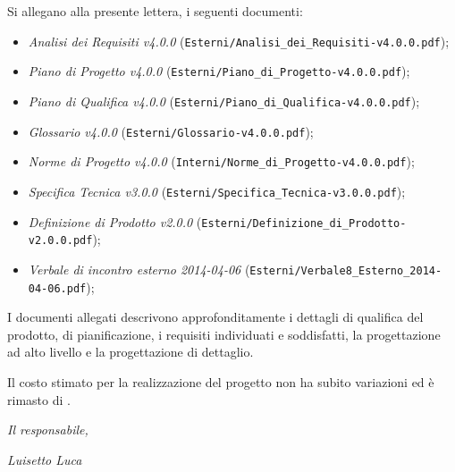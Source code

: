 \documentclass[10pt,a4paper,sans]{moderncv}        %
\begin{document}
Si allegano alla presente lettera, i seguenti documenti:
\begin{itemize}
	\item \textit{Analisi dei Requisiti v4.0.0} ({\verb!Esterni/Analisi_dei_Requisiti-v4.0.0.pdf!});
	\item \textit{Piano di Progetto v4.0.0} ({\verb!Esterni/Piano_di_Progetto-v4.0.0.pdf!});
	\item \textit{Piano di Qualifica v4.0.0} ({\verb!Esterni/Piano_di_Qualifica-v4.0.0.pdf!});
	\item \textit{Glossario v4.0.0} ({\verb!Esterni/Glossario-v4.0.0.pdf!});
	\item \textit{Norme di Progetto v4.0.0} ({\verb!Interni/Norme_di_Progetto-v4.0.0.pdf!});
	\item \textit{Specifica Tecnica v3.0.0} ({\verb!Esterni/Specifica_Tecnica-v3.0.0.pdf!});
	\item \textit{Definizione di Prodotto v2.0.0} ({\verb!Esterni/Definizione_di_Prodotto-v2.0.0.pdf!});
	\item \textit{Verbale di incontro esterno 2014-04-06} ({\verb!Esterni/Verbale8_Esterno_2014-04-06.pdf!});
\end{itemize}

I documenti allegati descrivono approfonditamente i dettagli di qualifica del prodotto, di pianificazione, i requisiti individuati e soddisfatti, la progettazione ad alto livello e la progettazione di dettaglio.

Il costo stimato per la realizzazione del progetto non ha subito variazioni ed è rimasto di \textbf{}.
\begin{flushright}
\textit{Il responsabile,} 

\textit{Luisetto Luca}
\end{flushright}
\end{document}
